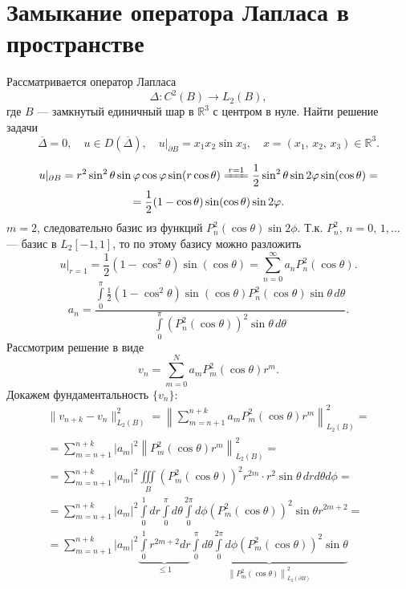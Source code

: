 \documentclass[a4paper]{article}
\begin{document}
\section{Замыкание оператора Лапласа в пространстве}
\begin{hiProb}[№16]
Рассматривается оператор Лапласа
\[
	\Delta\colon C^2 (B)\to L_2 (B),
\] 
где $B$ --- замкнутый единичный шар в $\mathbb{R}^3$ с центром
в нуле. Найти решение задачи
\[
	\overline{\Delta}=0,\quad u \in  D\left( \overline{\Delta} \right) ,\quad u|_{\partial B}=x_1 x_2 \sin x_3,\quad
	x=(x_1,\,x_2,\,x_3) \in \mathbb{R}^3
.\] 
\end{hiProb}
\begin{sol}
\begin{multline*}
u|_{\partial B}=r^2 \sin^2 \theta \sin\phi \cos\phi \sin
(r \cos\theta)\xlongequal[]{r=1}\frac{1}{2}\sin^2\theta 
\sin 2\phi \sin(\cos\theta)=\\= \frac{1}{2} (1-\cos\theta)
\sin(\cos\theta)\sin2\phi
.\end{multline*} 
$m=2$, следовательно базис из функций $P_n^2(\cos\theta)
 \sin 2\phi$. Т.\:к. $P_n^2$, $n=0,\,1,\ldots$ --- базис в
 $L_2[-1,1]$, то по этому базису можно разложить
\[
	u|_{r=1}= \frac{1}{2}(1-\cos^2 \theta) \sin(\cos
	\theta)= \sum_{n=0}^{\infty} a_n P_n^2(\cos\theta)
.\] 
\[
	a_n=\dfrac{\int\limits_{0}^{\pi} \frac{1}{2}(1-\cos^2\theta)\sin (\cos \theta) P_n^2 (\cos \theta) \sin \theta \,d\theta }{
	\int\limits_{0}^{\pi} (P_n^2(\cos\theta))^2 \sin\theta
\,d\theta}
.\] 
Рассмотрим решение в виде
\[
	v_n= \sum_{m=0}^{N} a_m P_m^2 (\cos\theta)r^m
.\] 
Докажем фундаментальность $\{v_n\} $:
\begin{multline*}
	\| v_{n+k}-v_n\|^2_{L_2(B)}= \left\lVert \sum_{m=n+1}^{n+k} a_m
	P_m^2 (\cos \theta)r^m\right\rVert^2_{L_2(B)}=\\=
	\sum_{m=n+1}^{n+k} |a_m|^2 \left\lVert P_m^2 (\cos \theta) r^m\right\rVert^2_{L_2(B)}= \\=\sum_{m=n+1}^{n+k} |a_m|^2
	\iiint\limits_{B}^{} \left( P_m^2 (\cos \theta) \right) ^2 r^{2m}\cdot r^2 \sin \theta\,dr d\theta d\phi=\\=
	\sum_{m=n+1}^{n+k} |a_m|^2 \int\limits_{0}^{1} dr
	\int\limits_{0}^{\pi} d\theta \int\limits_{0}^{2\pi} 
	d\phi \left( P_m^2 (\cos \theta) \right) ^2 \sin \theta
	r^{2m+2}=\\= \sum_{m=n+1}^{n+k} |a_m|^2 \underbrace{
	\int\limits_{0}^{1} r^{2m+2}dr }_{\le 1}
	\underbrace{\int\limits_{0}^{\pi} d\theta \int\limits_{0}^{2\pi}  d\phi \left( P_m^2(\cos\theta) \right) ^2 \sin\theta  }_{\left\lVert P_m^2 (\cos \theta)\right\rVert^2_{L_2(\partial B)}}

\end{multline*}
\end{sol}
\end{document}
